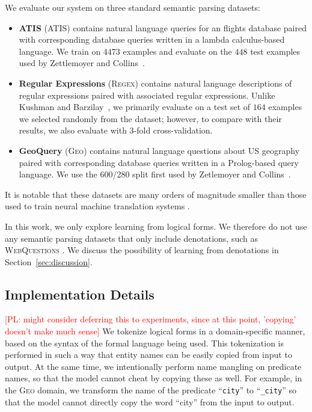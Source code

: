 \documentclass[11pt,letterpaper]{article}
\newcommand{\atis}{\textsc{ATIS}\xspace}
\newcommand{\regex}{\textsc{Regex}\xspace}
\newcommand{\geo}{\textsc{Geo}\xspace}
\newcommand\pl[1]{\textcolor{red}{[PL: #1]}}
\begin{document}
We evaluate our system on three standard semantic parsing datasets:
\begin{itemize}
  \item \textbf{ATIS} (\atis) contains 
    natural language queries for an flights database
    paired with corresponding database queries written in a 
    lambda calculus-based language.  
    We train on $4473$ examples and evaluate on the $448$
    test examples used by Zettlemoyer and 
    Collins~.

  \item \textbf{Regular Expressions} (\regex)
  contains natural language descriptions of regular expressions
  paired with associated regular expressions.
  Unlike Kushman and Barzilay~, 
  we primarily evaluate
  on a test set of $164$ examples we selected randomly
  from the dataset;
  however, to compare with their results, we also evaluate
  with 3-fold cross-validation.

  \item \textbf{GeoQuery} (\geo) contains
  natural language questions about US geography
  paired with corresponding database queries written in a Prolog-based
  query language.
  We use the 600/280 split first used by
  Zetlemoyer and Collins~.
\end{itemize}

It is notable that these datasets are many orders of magnitude smaller
than those used to train neural machine translation systems
\cite{sutskever2014sequence,bahdanau2014neural}.

In this work, we only explore learning from logical forms.
We therefore do not use any semantic parsing datasets
that only include denotations,
such as \textsc{WebQuestions} \cite{berant2013freebase}.
We discuss the possibility of learning from denotations
in Section~\ref{sec:discussion}.


\subsection{Implementation Details}
\pl{might consider deferring this to experiments,
since at this point, 'copying' doesn't make much sense}
We tokenize logical forms in a domain-specific manner,
based on the syntax of the formal language being used.
This tokenization is performed in such a way that
entity names can be easily copied from input to output.
At the same time, we intentionally perform name mangling on predicate names,
so that the model cannot cheat by copying these as well.
For example, in the \geo domain, we transform the name
of the predicate ``\texttt{city}'' to ``\texttt{\_city}''
so that the model cannot directly copy the word ``city'' from the input 
to output.
\end{document}

